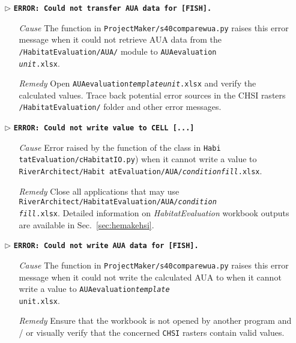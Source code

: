 \begin{itemize}
	\item[$\triangleright$]\textbf{\texttt{ERROR: Could not transfer AUA data for [FISH].}}
	\begin{itemize}
		\item[\textit{Cause}\hspace{0.27cm}] The  function in \texttt{ProjectMaker/s40{\myUnderscore}compare{\myUnderscore}wua.py} raises this error message when it could not retrieve AUA data from the \texttt{/HabitatEvaluation/AUA/} module to  \texttt{AUA{\myUnderscore}evaluation\\\textit{{\myUnderscore}unit}.xlsx}.
		\item[\textit{Remedy}] Open \texttt{AUA{\myUnderscore}evaluation\textit{{\myUnderscore}template{\myUnderscore}unit}.xlsx} and verify the calculated values. Trace back potential error sources in the CHSI rasters \texttt{/HabitatEvaluation/} folder and other error messages.\\
	\end{itemize}	
	
	\item[$\triangleright$]\textbf{\texttt{ERROR: Could not write value to CELL [...]}}
	\begin{itemize}
		\item[\textit{Cause}\hspace{0.27cm}] Error raised by the  function of the  class in \texttt{Habi tatEvaluation/cHabitatIO.py}) when it cannot write a value to \texttt{RiverArchitect/Habit atEvaluation/AUA/\textit{condition{\myUnderscore}fill}.xlsx}.
		\item[\textit{Remedy}] Close all applications that may use \texttt{RiverArchitect/HabitatEvaluation/AUA/\textit{condition}{\myUnderscore}\\\textit{fill}.xlsx}. Detailed information on \textit{HabitatEvaluation} workbook outputs are available in Sec.~\ref{sec:hemakehsi}.\\
	\end{itemize}
	
	\item[$\triangleright$]\textbf{\texttt{ERROR: Could not write AUA data for [FISH].}}
	\begin{itemize}
		\item[\textit{Cause}\hspace{0.27cm}] The  function in \texttt{ProjectMaker/s40{\myUnderscore}compare{\myUnderscore}wua.py} raises this error message when it could not write the calculated AUA to when it cannot write a value to \texttt{AUA{\myUnderscore}evaluation\textit{{\myUnderscore}template{\myUnderscore}}\\\texttt{unit}.xlsx}.
		\item[\textit{Remedy}] Ensure that the workbook is not opened by another program and / or visually verify that the concerned \texttt{CHSI} rasters contain valid values.\\
	\end{itemize}
	

\end{itemize}
